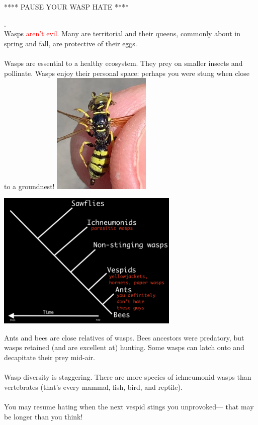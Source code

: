 \documentclass[14pt]{extarticle}
\begin{document}
\pagecolor{black}
\color{white}

\begin{center}\huge{**** PAUSE YOUR WASP HATE ****}\end{center}

\begin{multicols}{2}
\textcolor{black}{.} \\ %
\noindent Wasps \textcolor{red}{aren't evil}. Many are territorial and their queens, commonly about in spring and fall, are protective of their eggs. \\\\
\noindent Wasps are \textcolor{colour1}{essential} to a healthy ecosystem. They prey on smaller insects and \textcolor{colour1}{pollinate}. Wasps enjoy their personal space: perhaps you were stung when close to a groundnest! 
\includegraphics[width=0.35\textwidth, right]{wasp_smile.png}
\end{multicols}

\begin{center}\includegraphics[width=0.65\textwidth,]{wasp_phylo.png}\end{center}

\noindent Ants and bees are close relatives of wasps. Bees ancestors were predatory, but wasps retained (and are excellent at) hunting. Some wasps can latch onto and \textcolor{colour1}{decapitate} their prey mid-air. \\\\
\noindent Wasp \textcolor{colour1}{diversity} is staggering. There are more species of ichneumonid wasps than \textcolor{colour1}{vertebrates} (that's every mammal, fish, bird, and reptile).\\\\
You may resume hating when the next vespid stings you unprovoked— that may be longer than you think!
\end{document}
